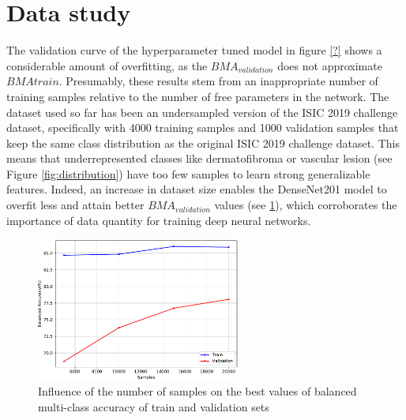 \section{Data study} \label{section:balance}
    The validation curve of the hyperparameter tuned model in figure \ref{?} shows a considerable amount of overfitting, as the $BMA_{validation}$ does not approximate $BMA{train}$. Presumably, these results stem from an inappropriate number of training samples relative to the number of free parameters in the network. The dataset used so far has been an undersampled version of the ISIC 2019 challenge dataset, specifically with 4000 training samples and 1000 validation samples that keep the same class distribution as the original ISIC 2019 challenge dataset. This means that underrepresented classes like dermatofibroma or vascular lesion (see Figure  \ref{fig:distribution}) have too few samples to learn strong generalizable features. Indeed, an increase in dataset size enables the DenseNet201 model to overfit less and attain better $BMA_{validation}$ values (see \ref{fig:samples_comp}), which corroborates the importance of data quantity for training deep neural networks.   \par
    
    \begin{figure}[ht]
        \centering
        \includegraphics[width=0.6\textwidth]{figs/densenet201_samples_comp.pdf}
        \caption{Influence of the number of samples on the best values of balanced multi-class accuracy of train and validation sets}
        \label{fig:samples_comp}
    \end{figure}
    
